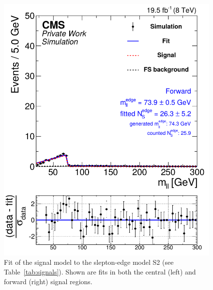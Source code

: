 \begin{figure}[t]
\begin{minipage}[t]{0.49\textwidth}
    \includegraphics[width=\textwidth]{plots/results/fit/mcFits/shapeIllustrationKTriangle_SignalInclusive_Combined_Full2012_KTriangle_MC_slepton_500_175_100_Forward.pdf}
  \end{minipage}
\caption{Fit of the signal model to the slepton-edge model S2 (see Table~\ref{tab:signals}). Shown are fits in both the central (left) and forward (right) signal regions.}
  \label{fig:signalModel:slepton}
\end{figure}


